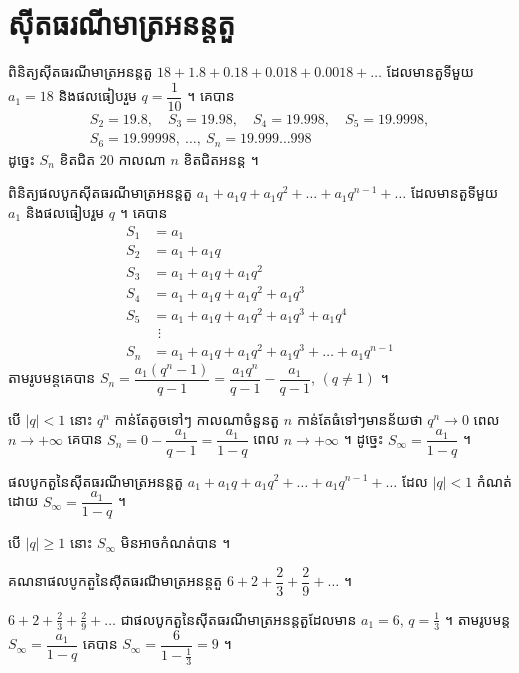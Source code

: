 \section{ស៊ីតធរណីមាត្រអនន្តតួ}

\begin{example}[ឧទាហរណ៍]
ពិនិត្យស៊ីតធរណីមាត្រអនន្តតួ $18 + 1.8 + 0.18 + 0.018 + 0.0018 + \ldots$ ដែលមានតួទីមួយ $a_1 = 18$ និងផលធៀបរួម $q = \dfrac{1}{10}$ ។ គេបាន
\[
\begin{gathered} S_2 = 19.8,\quad S_3 = 19.98,\quad S_4 = 19.998,\quad S_5 = 19.9998,\\ S_6 = 19.99998,\ \ldots,\ S_n = 19.999\ldots998 \end{gathered}
\]
ដូច្នេះ $S_n$ ខិតជិត $20$ កាលណា $n$ ខិតជិតអនន្ត ។
\end{example}

ពិនិត្យផលបូកស៊ីតធរណីមាត្រអនន្តតួ $a_1 + a_1 q + a_1 q^2 + \ldots + a_1 q^{n-1} + \ldots$ ដែលមានតួទីមួយ $a_1$ និងផលធៀបរួម $q$ ។ គេបាន
\[
\begin{aligned}
S_1 &= a_1\\
S_2 &= a_1 + a_1 q\\
S_3 &= a_1 + a_1 q + a_1 q^2\\
S_4 &= a_1 + a_1 q + a_1 q^2 + a_1 q^3\\
S_5 &= a_1 + a_1 q + a_1 q^2 + a_1 q^3 + a_1 q^4\\
&\ \,\vdots\\
S_n &= a_1 + a_1 q + a_1 q^2 + a_1 q^3 + \ldots + a_1 q^{n-1}
\end{aligned}
\]
តាមរូបមន្តគេបាន $S_n = \dfrac{a_1(q^n - 1)}{q - 1} = \dfrac{a_1 q^n}{q - 1} - \dfrac{a_1}{q - 1}$, $(q \ne 1)$ ។

បើ $|q| < 1$ នោះ $q^n$ កាន់តែតូចទៅៗ កាលណាចំនួនតួ $n$ កាន់តែធំទៅៗមានន័យថា $q^n \to 0$ ពេល $n \to +\infty$ គេបាន $S_n = 0 - \dfrac{a_1}{q - 1} = \dfrac{a_1}{1 - q}$ ពេល $n \to +\infty$ ។ ដូច្នេះ $S_\infty = \dfrac{a_1}{1 - q}$ ។

\begin{formulaBox}[ជាទូទៅ]
ផលបូកតួនៃស៊ីតធរណីមាត្រអនន្តតួ $a_1 + a_1 q + a_1 q^2 + \ldots + a_1 q^{n-1} + \ldots$ ដែល $|q| < 1$ កំណត់ដោយ $S_\infty = \dfrac{a_1}{1 - q}$ ។
\end{formulaBox}

\begin{note}
បើ $|q| \ge 1$ នោះ $S_\infty$ មិនអាចកំណត់បាន ។
\end{note}

\begin{example}[លំហាត់គំរូ ១]
គណនាផលបូកតួនៃស៊ីតធរណីមាត្រអនន្តតួ $6 + 2 + \dfrac{2}{3} + \dfrac{2}{9} + \ldots$ ។
\end{example}
\ans
$6 + 2 + \frac{2}{3} + \frac{2}{9} + \ldots$ ជាផលបូកតួនៃស៊ីតធរណីមាត្រអនន្តតួដែលមាន $a_1 = 6$, $q = \frac{1}{3}$ ។ តាមរូបមន្ត $S_\infty = \dfrac{a_1}{1 - q}$ គេបាន $S_\infty = \dfrac{6}{1 - \frac{1}{3}} = 9$ ។

